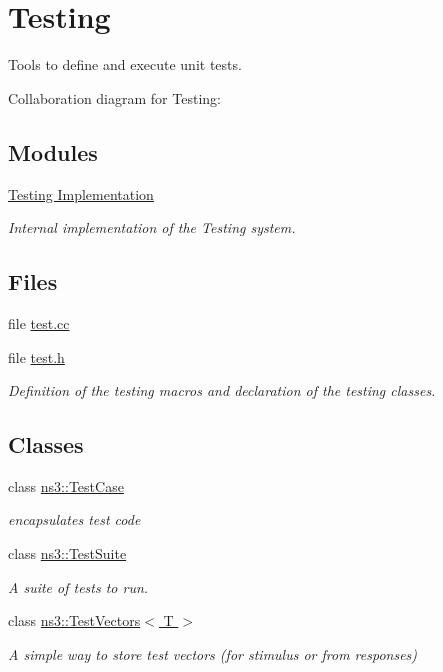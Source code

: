 \hypertarget{group__testing}{}\section{Testing}
\label{group__testing}


Tools to define and execute unit tests.  


Collaboration diagram for Testing\+:
\subsection*{Modules}
\begin{DoxyCompactItemize}
\item 
\hyperlink{group__testingimpl}{Testing Implementation}
\begin{DoxyCompactList}\small\item\em Internal implementation of the Testing system. \end{DoxyCompactList}\end{DoxyCompactItemize}
\subsection*{Files}
\begin{DoxyCompactItemize}
\item 
file \hyperlink{test_8cc}{test.\+cc}
\item 
file \hyperlink{test_8h}{test.\+h}
\begin{DoxyCompactList}\small\item\em Definition of the testing macros and declaration of the testing classes. \end{DoxyCompactList}\end{DoxyCompactItemize}
\subsection*{Classes}
\begin{DoxyCompactItemize}
\item 
class \hyperlink{classns3_1_1TestCase}{ns3\+::\+Test\+Case}
\begin{DoxyCompactList}\small\item\em encapsulates test code \end{DoxyCompactList}\item 
class \hyperlink{classns3_1_1TestSuite}{ns3\+::\+Test\+Suite}
\begin{DoxyCompactList}\small\item\em A suite of tests to run. \end{DoxyCompactList}\item 
class \hyperlink{classns3_1_1TestVectors}{ns3\+::\+Test\+Vectors$<$ T $>$}
\begin{DoxyCompactList}\small\item\em A simple way to store test vectors (for stimulus or from responses) \end{DoxyCompactList}\end{DoxyCompactItemize}
